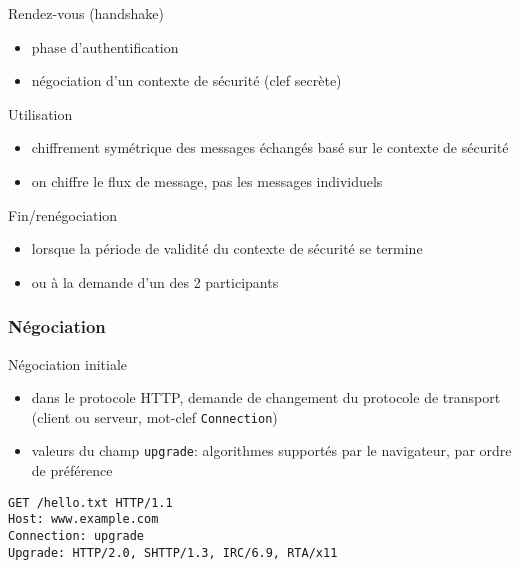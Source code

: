 \begin{reveals}
\begin{frame}
  \vfill
  \begin{block}{Rendez-vous (handshake)}
    \begin{itemize}
    \item phase d'authentification
    \item négociation d'un contexte de sécurité (clef secrète)
    \end{itemize}
  \end{block}

  \vfill
  \begin{block}{Utilisation}
    \begin{itemize}
    \item chiffrement symétrique des messages échangés basé sur le contexte de sécurité
    \item on chiffre le flux de message, pas les messages individuels 
    \end{itemize}
  \end{block}

  \vfill

  \begin{block}{Fin/renégociation}
    \begin{itemize}
    \item lorsque la période de validité du contexte de sécurité se termine
    \item ou à la demande d'un des 2 participants
    \end{itemize}
  \end{block}

  \vfill
\end{frame}


\begin{frame}[fragile]
  \frametitle{Négociation}

  \vfill

   \begin{block}{Négociation initiale}
     \begin{itemize}
     \item dans le protocole HTTP, demande de changement du protocole
       de transport (client ou serveur, mot-clef \texttt{Connection})
     \item valeurs du champ \texttt{upgrade}: algorithmes supportés par le
       navigateur, par ordre de préférence
     \end{itemize}
  \end{block}

  \vfill

\begin{verbatim}
GET /hello.txt HTTP/1.1
Host: www.example.com
Connection: upgrade
Upgrade: HTTP/2.0, SHTTP/1.3, IRC/6.9, RTA/x11
\end{verbatim}
  

\end{frame}
\end{reveals}
